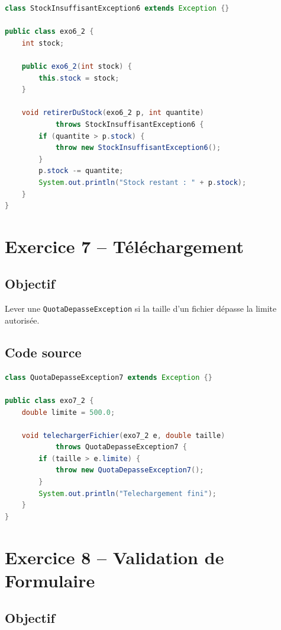 \begin{lstlisting}[language=Java, caption={exo6\_2.java -- StockInsuffisantException}]
class StockInsuffisantException6 extends Exception {}

public class exo6_2 {
    int stock;

    public exo6_2(int stock) {
        this.stock = stock;
    }

    void retirerDuStock(exo6_2 p, int quantite)
            throws StockInsuffisantException6 {
        if (quantite > p.stock) {
            throw new StockInsuffisantException6();
        }
        p.stock -= quantite;
        System.out.println("Stock restant : " + p.stock);
    }
}
\end{lstlisting}

\section{Exercice 7 -- Téléchargement}

\subsection{Objectif}

Lever une \texttt{QuotaDepasseException} si la taille d'un fichier dépasse la limite autorisée.

\subsection{Code source}

\begin{lstlisting}[language=Java, caption={exo7\_2.java -- QuotaDepasseException}]
class QuotaDepasseException7 extends Exception {}

public class exo7_2 {
    double limite = 500.0;

    void telechargerFichier(exo7_2 e, double taille)
            throws QuotaDepasseException7 {
        if (taille > e.limite) {
            throw new QuotaDepasseException7();
        }
        System.out.println("Telechargement fini");
    }
}
\end{lstlisting}

\section{Exercice 8 -- Validation de Formulaire}

\subsection{Objectif}

